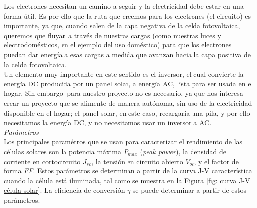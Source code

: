 \documentclass[12pt]{article}
\begin{document}
	\pagebreak
	
	\noindent Los electrones necesitan un camino a seguir y la electricidad debe estar en una forma útil. Es por ello que la ruta que creemos para los electrones (el circuito) es importante, ya que, cuando salen de la capa negativa de la celda fotovoltaica, queremos que fluyan a través de nuestras cargas (como nuestras luces y electrodomésticos, en el ejemplo del uso doméstico) para que los electrones puedan dar energía a esas cargas a medida que avanzan hacia la capa positiva de la celda fotovoltaica. \\
	
	
	\noindent Un elemento muy importante en este sentido es el inversor, el cual convierte la energía DC producida por un panel solar, a energía AC, lista para ser usada en el hogar. Sin embargo, para nuestro proyecto no es necesario, ya que nos interesa crear un proyecto que se alimente de manera autónoma, sin uso de la electricidad disponible en el hogar; el panel solar, en este caso, recargaría una pila, y por ello necesitamos la energía DC, y no necesitamos usar un inversor a AC. \\ 
	
	\noindent \textit{Parámetros}\\
	
	\noindent Los principales paramétros que se usan para caracterizar el rendimiento de las células solares son la potencia máxima $P_{max}$ (\textit{peak power}), la densidad de corriente en cortocircuito $J_{sc}$, la tensión en circuito abierto $V_{oc}$, y el factor de forma \textit{FF}. Estos parámetros se determinan a partir de la curva J-V característica cuando la célula está iluminada, tal como se muestra en la Figura \ref{fig: curva J-V célula solar}. La eficiencia de conversión $\eta$ se puede determinar a partir de estos parámetros. \\
	
\end{document}
